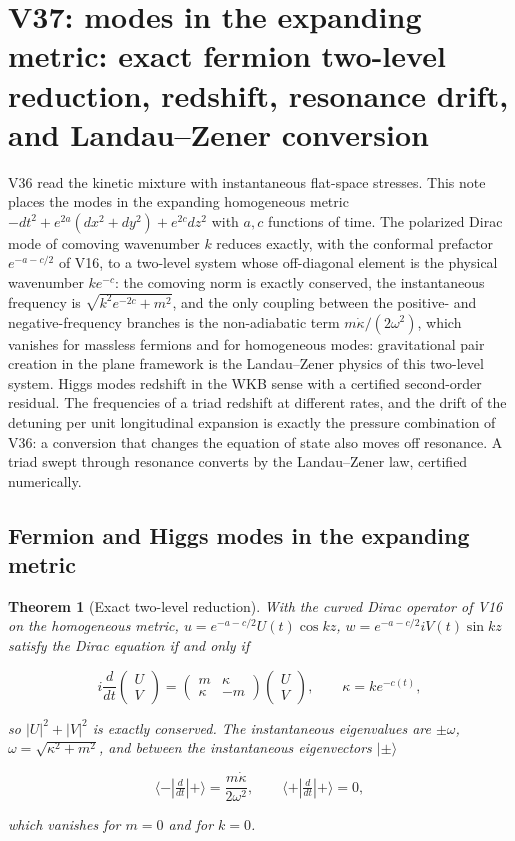 \documentclass[11pt]{article}
\newtheorem{theorem}{Theorem}[section]
\theoremstyle{remark}
\begin{document}
\section{V37: modes in the expanding metric: exact fermion two-level reduction, redshift, resonance drift, and Landau--Zener conversion}
\label{sec:v20v37}

V36 read the kinetic mixture with instantaneous flat-space
stresses.  This note places the modes in the expanding homogeneous
metric \(-dt^2+e^{2a}(dx^2+dy^2)+e^{2c}dz^2\) with \(a,c\) functions of
time.  The polarized Dirac mode of comoving wavenumber \(k\) reduces
exactly, with the conformal prefactor \(e^{-a-c/2}\) of V16, to a
two-level system whose off-diagonal element is the physical
wavenumber \(ke^{-c}\): the comoving norm is exactly conserved, the
instantaneous frequency is \(\sqrt{k^2e^{-2c}+m^2}\), and the only
coupling between the positive- and negative-frequency branches is
the non-adiabatic term \(m\dot\kappa/(2\omega^2)\), which vanishes for
massless fermions and for homogeneous modes: gravitational pair
creation in the plane framework is the Landau--Zener physics of this
two-level system.  Higgs modes redshift in the WKB sense with a
certified second-order residual.  The frequencies of a triad
redshift at different rates, and the drift of the detuning per unit
longitudinal expansion is exactly the pressure combination of V36:
a conversion that changes the equation of state also moves off
resonance.  A triad swept through resonance converts by the
Landau--Zener law, certified numerically.

\subsection{Fermion and Higgs modes in the expanding metric}

\begin{theorem}[Exact two-level reduction]
\label{thm:v20v37-twolevel}
With the curved Dirac operator of V16 on the homogeneous metric,
\(u=e^{-a-c/2}U(t)\cos kz\), \(w=e^{-a-c/2}iV(t)\sin kz\) satisfy the
Dirac equation if and only if

\[
 i\frac d{dt}\begin{pmatrix}U\\V\end{pmatrix}
 =\begin{pmatrix}m&\kappa\\ \kappa&-m\end{pmatrix}\begin{pmatrix}U\\V\end{pmatrix},\qquad
 \kappa=ke^{-c(t)},                                                    \tag{40.1}
\]

so \(|U|^2+|V|^2\) is exactly conserved.  The instantaneous
eigenvalues are \(\pm\omega\), \(\omega=\sqrt{\kappa^2+m^2}\), and between
the instantaneous eigenvectors \(|\pm\rangle\)

\[
 \langle-|\tfrac d{dt}|+\rangle=\frac{m\dot\kappa}{2\omega^2},\qquad
 \langle+|\tfrac d{dt}|+\rangle=0,                                     \tag{40.2}
\]

which vanishes for \(m=0\) and for \(k=0\).
\end{theorem}
\end{document}
